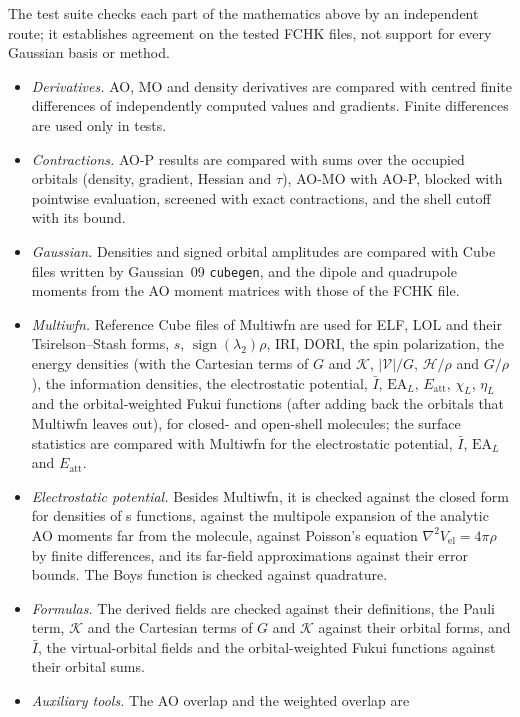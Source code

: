 \documentclass[11pt,a4paper]{article}
\begin{document}
The test suite checks each part of the mathematics above by an independent
route; it establishes agreement on the tested FCHK files, not support for
every Gaussian basis or method.
\begin{itemize}
\item \emph{Derivatives.} AO, MO and density derivatives are compared with
 centred finite differences of independently computed values and
 gradients. Finite differences are used only in tests.
\item \emph{Contractions.} AO-P results are compared with sums over the
 occupied orbitals (density, gradient, Hessian and $\tau$), AO-MO with
 AO-P, blocked with pointwise evaluation, screened with exact
 contractions, and the shell cutoff with its bound.
\item \emph{Gaussian.} Densities and signed orbital amplitudes are compared
 with Cube files written by Gaussian~09 \texttt{cubegen}, and the dipole
 and quadrupole moments from the AO moment matrices with those of the FCHK
 file.
\item \emph{Multiwfn.} Reference Cube files of Multiwfn are used for ELF,
 LOL and their Tsirelson--Stash forms, $s$,
 $\operatorname{sign}(\lambda_2)\rho$, IRI, DORI, the spin polarization,
 the energy densities (with the Cartesian terms of $G$ and $\mathcal K$,
 $|\mathcal V|/G$, $\mathcal H/\rho$ and $G/\rho$), the information
 densities, the electrostatic potential, $\bar I$, $\mathrm{EA}_L$,
 $E_{\mathrm{att}}$, $\chi_L$, $\eta_L$ and the orbital-weighted Fukui
 functions (after adding back the orbitals that Multiwfn leaves out), for
 closed- and open-shell molecules; the surface statistics are compared with
 Multiwfn for the electrostatic potential, $\bar I$, $\mathrm{EA}_L$ and
 $E_{\mathrm{att}}$.
\item \emph{Electrostatic potential.} Besides Multiwfn, it is checked
 against the closed form for densities of s functions, against the
 multipole expansion of the analytic AO moments far from the molecule,
 against Poisson's equation $\nabla^2V_{\mathrm{el}}=4\pi\rho$ by finite
 differences, and its far-field approximations against their error bounds.
 The Boys function is checked against quadrature.
\item \emph{Formulas.} The derived fields are checked against their
 definitions, the Pauli term, $\mathcal K$ and the Cartesian terms of $G$
 and $\mathcal K$ against their orbital forms, and $\bar I$, the
 virtual-orbital fields and the orbital-weighted Fukui functions against
 their orbital sums.
\item \emph{Auxiliary tools.} The AO overlap and the weighted overlap are

\end{itemize}
\end{document}
